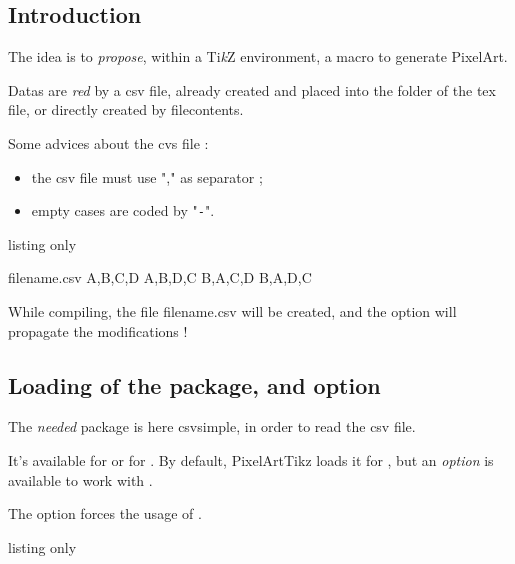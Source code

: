 \documentclass{article}
\newcommand\Cle[1]{{\bfseries\sffamily\textlangle #1\textrangle}}
\begin{document}
\subsection{Introduction}

The idea is to \textit{propose}, within a Ti\textit{k}Z environment, a macro to generate PixelArt.

Datas are \textit{red} by a \textsf{csv} file, already created and placed into the folder of the \textsf{tex} file, or directly created by \textsf{filecontents}.

\medskip

Some advices about the \textsf{cvs} file :

\begin{itemize}
	\item the \textsf{csv} file must use "," as separator ;
	\item empty cases are coded by "\texttt{-}".
\end{itemize}

\begin{PresentationCode}{listing only}
\begin{filecontents*}{filename.csv}
	A,B,C,D
	A,B,D,C
	B,A,C,D
	B,A,D,C
\end{filecontents*}
\end{PresentationCode}

While compiling, the file \textsf{filename.csv} will be created, and the option \Cle{[overwrite]} will propagate the modifications !

\subsection{Loading of the package, and option}

The \textit{needed} package is here \textsf{csvsimple}, in order to read the \textsf{csv} file.

It's available for  or for . By default, \textsf{PixelArtTikz} loads it for , but an \textit{option} is available to work with .

\smallskip

The option \Cle{[csvii]} forces the usage of .

\begin{PresentationCode}{listing only}
\usepackage{PixelArtTikz}                     %

\usepackage[csvii]{PixelArtTikz}              %
\end{PresentationCode}
\end{document}
